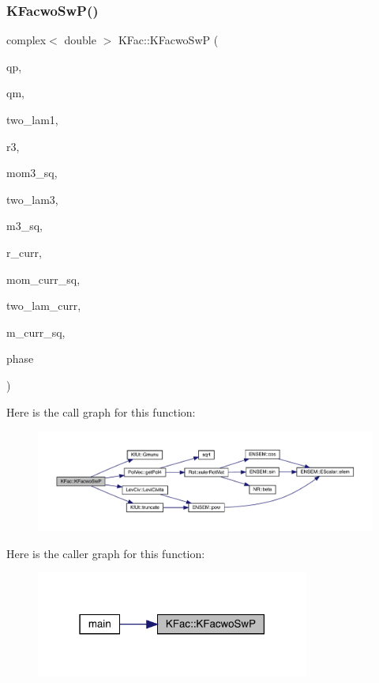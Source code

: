 \subsubsection{\texorpdfstring{KFacwoSwP()}{KFacwoSwP()}}
{\footnotesize\ttfamily complex$<$ double $>$ K\+Fac\+::\+K\+Facwo\+SwP (\begin{DoxyParamCaption}\item[{Eigen\+::\+Vector\+Xd \&}]{qp,  }\item[{Eigen\+::\+Vector\+Xd \&}]{qm,  }\item[{const int \&}]{two\+\_\+lam1,  }\item[{std\+::vector$<$ double $>$ \&}]{r3,  }\item[{double \&}]{mom3\+\_\+sq,  }\item[{const int \&}]{two\+\_\+lam3,  }\item[{double \&}]{m3\+\_\+sq,  }\item[{std\+::vector$<$ double $>$ \&}]{r\+\_\+curr,  }\item[{double \&}]{mom\+\_\+curr\+\_\+sq,  }\item[{const int \&}]{two\+\_\+lam\+\_\+curr,  }\item[{double \&}]{m\+\_\+curr\+\_\+sq,  }\item[{\mbox{\hyperlink{structPh_1_1phChars}{Ph\+::ph\+Chars}} \&}]{phase }\end{DoxyParamCaption})}

Here is the call graph for this function\+:
\nopagebreak
\begin{figure}[H]
\begin{center}
\leavevmode
\includegraphics[width=350pt]{d2/d89/namespaceKFac_a2ae9d69821729f6946651703e8990e58_cgraph}
\end{center}
\end{figure}
Here is the caller graph for this function\+:
\nopagebreak
\begin{figure}[H]
\begin{center}
\leavevmode
\includegraphics[width=255pt]{d2/d89/namespaceKFac_a2ae9d69821729f6946651703e8990e58_icgraph}
\end{center}
\end{figure}
\mbox{\label{namespaceKFac_a56130e258872427e83c530a5a471cf5c}} 
